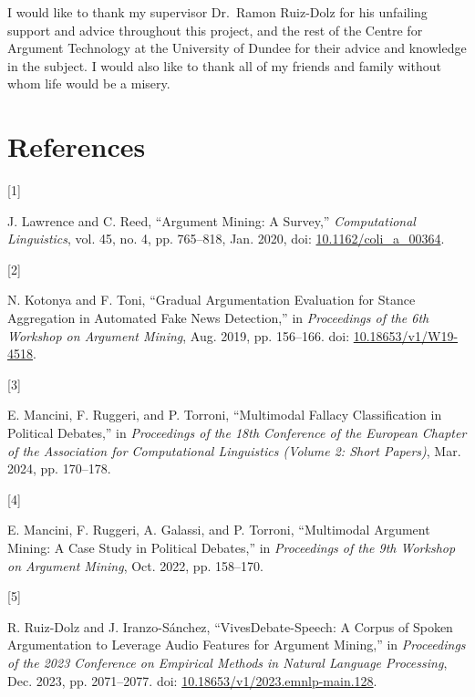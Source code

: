 \documentclass[twocolumn]{article}
\newlength{\cslhangindent}
\newlength{\csllabelwidth}
\newenvironment{CSLReferences}[2] %
 {\begin{list}{}{%
  \setlength{\itemindent}{0pt}
  \setlength{\leftmargin}{0pt}
  \setlength{\parsep}{0pt}
  \ifodd #1
   \setlength{\leftmargin}{\cslhangindent}
   \setlength{\itemindent}{-1\cslhangindent}
  \fi
  \setlength{\itemsep}{#2\baselineskip}}}
 {\end{list}}
\newcommand{\CSLLeftMargin}[1]{\parbox[t]{\csllabelwidth}{\strut#1\strut}}
\newcommand{\CSLRightInline}[1]{\parbox[t]{\linewidth - \csllabelwidth}{\strut#1\strut}}
\begin{document}
I would like to thank my supervisor Dr.~Ramon Ruiz-Dolz for his
unfailing support and advice throughout this project, and the rest of
the Centre for Argument Technology at the University of Dundee for their
advice and knowledge in the subject. I would also like to thank all of
my friends and family without whom life would be a misery.

\section*{References}\label{references}

\label{refs}
\begin{CSLReferences}{0}{0}
\CSLLeftMargin{{[}1{]} }%
\CSLRightInline{J. Lawrence and C. Reed, {``Argument {Mining}: {A
Survey},''} \emph{Computational Linguistics}, vol. 45, no. 4, pp.
765--818, Jan. 2020, doi:
\href{https://doi.org/10.1162/coli_a_00364}{10.1162/coli\_a\_00364}.}

\CSLLeftMargin{{[}2{]} }%
\CSLRightInline{N. Kotonya and F. Toni, {``Gradual {Argumentation
Evaluation} for {Stance Aggregation} in {Automated Fake News
Detection},''} in \emph{Proceedings of the 6th {Workshop} on {Argument
Mining}}, Aug. 2019, pp. 156--166. doi:
\href{https://doi.org/10.18653/v1/W19-4518}{10.18653/v1/W19-4518}.}

\CSLLeftMargin{{[}3{]} }%
\CSLRightInline{E. Mancini, F. Ruggeri, and P. Torroni, {``Multimodal
{Fallacy Classification} in {Political Debates},''} in \emph{Proceedings
of the 18th {Conference} of the {European Chapter} of the {Association}
for {Computational Linguistics} ({Volume} 2: {Short Papers})}, Mar.
2024, pp. 170--178.}

\CSLLeftMargin{{[}4{]} }%
\CSLRightInline{E. Mancini, F. Ruggeri, A. Galassi, and P. Torroni,
{``Multimodal {Argument Mining}: {A Case Study} in {Political
Debates},''} in \emph{Proceedings of the 9th {Workshop} on {Argument
Mining}}, Oct. 2022, pp. 158--170.}

\CSLLeftMargin{{[}5{]} }%
\CSLRightInline{R. Ruiz-Dolz and J. Iranzo-Sánchez,
{``{VivesDebate-Speech}: {A Corpus} of {Spoken Argumentation} to
{Leverage Audio Features} for {Argument Mining},''} in \emph{Proceedings
of the 2023 {Conference} on {Empirical Methods} in {Natural Language
Processing}}, Dec. 2023, pp. 2071--2077. doi:
\href{https://doi.org/10.18653/v1/2023.emnlp-main.128}{10.18653/v1/2023.emnlp-main.128}.}


\end{CSLReferences}
\end{document}
